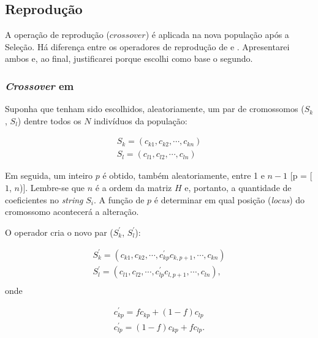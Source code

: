 \subsection{Reprodução}

	A operação de reprodução ($crossover$) é aplicada na nova população após a Seleção. Há diferença entre os operadores de reprodução de \cite{metodo2004} e \cite{metodo2011}. Apresentarei ambos e, ao final, justificarei porque escolhi como base o segundo.

\subsubsection{\emph{Crossover} em \cite{metodo2004}}
	
	Suponha que tenham sido escolhidos, aleatoriamente, um par de cromossomos ($S_k$, $S_l$) dentre todos os $N$ indivíduos da população:
	
	\begin{equation}
		\begin{array}{l}
			S_k = (c_{k1}, c_{k2}, \cdots, c_{kn})	\\
			S_l = (c_{l1}, c_{l2}, \cdots, c_{ln})	
		\end{array}
	\end{equation}

	Em seguida, um inteiro $p$ é obtido, também aleatoriamente, entre 1 e $n - 1$ [p = [$1$, $n$)]. Lembre-se que $n$ é a ordem da matriz $H$ e, portanto, a quantidade de coeficientes no \emph{string} $S_i$. A função de $p$ é determinar em qual posição (\emph{locus}) do cromossomo acontecerá a alteração.
	
	O operador cria o novo par ($S^{'}_k$, $S^{'}_l$):
	
	\begin{equation}
		\begin{array}{l}
			S^{'}_k = (c_{k1}, c_{k2}, \cdots, c^{'}_{kp} c_{k,p+1}, \cdots, c_{kn})	\\
			S^{'}_l = (c_{l1}, c_{l2}, \cdots,  c^{'}_{lp} c_{l,p+1}, \cdots, c_{ln}),	\\
			
		\end{array}
	\end{equation}
	onde
	
	\begin{equation}
		\begin{array}{l}
			c^{'}_{kp} = f c_{kp} + (1 - f) c_{lp}     \\
			c^{'}_{lp} = (1 - f) c_{kp} + f c_{lp}.
		\end{array}
	\end{equation}
	
